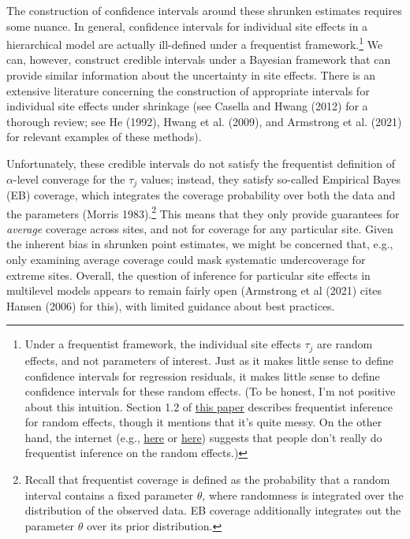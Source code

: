 \documentclass[]{article}
\begin{document}
The construction of confidence intervals around these shrunken estimates requires some nuance.
In general, confidence intervals for individual site effects in a hierarchical model are actually ill-defined under a frequentist framework.\footnote{Under a frequentist framework, the individual site effects $\tau_j$ are random effects, and not parameters of interest.
Just as it makes little sense to define confidence intervals for regression residuals, it makes little sense to define confidence intervals for these random effects.
(To be honest, I'm not positive about this intuition.
Section 1.2 of  \href{https://core.ac.uk/download/pdf/38903061.pdf}{this paper} describes frequentist inference for random effects, though it mentions that it's quite messy.
On the other hand, the internet (e.g., \href{https://stat.ethz.ch/pipermail/r-sig-mixed-models/2011q3/014077.html}{here} or \href{https://github.com/lme4/lme4/issues/497}{here}) suggests that people don't really do frequentist inference on the random effects.) }
We can, however, construct credible intervals under a Bayesian framework that can provide similar information about the uncertainty in site effects.
There is an extensive literature concerning the construction of appropriate intervals for individual site effects under shrinkage (see Casella and Hwang (2012) for a thorough review; see He (1992), Hwang et al. (2009), and Armstrong et al. (2021) for relevant examples of these methods).

Unfortunately, these credible intervals do not satisfy the frequentist definition of $\alpha$-level converage for the $\tau_j$ values; instead, they satisfy so-called Empirical Bayes (EB) coverage, which integrates the coverage probability over both the data and the parameters (Morris 1983).\footnote{Recall that frequentist coverage is defined as the probability that a random interval contains a fixed parameter $\theta$, where randomness is integrated over the distribution of the observed data.
EB coverage additionally integrates out the parameter $\theta$ over its prior distribution.}
This means that they only provide guarantees for \textit{average} coverage across sites, and not for coverage for any particular site.
Given the inherent bias in shrunken point estimates, we might be concerned that, e.g., only examining average coverage could mask systematic undercoverage for extreme sites.
Overall, the question of inference for particular site effects in multilevel models appears to remain fairly open (Armstrong et al (2021) cites Hansen (2006) for this), with limited guidance about best practices.
\end{document}
